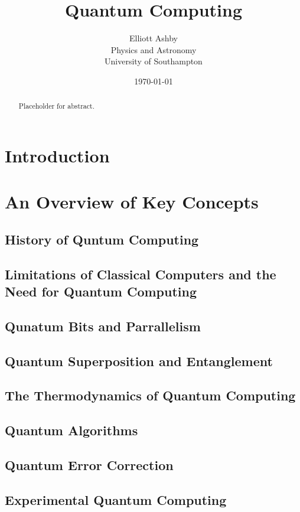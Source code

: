 \documentclass[12pt]{amsart}
\title{Quantum Computing}
\author{Elliott Ashby \\ Physics and Astronomy \\ University of Southampton}
\date{\monthyeardate\today}
\begin{document}
\begin{abstract}
    Placeholder for abstract.
\end{abstract}
\maketitle
\tableofcontents
\section{Introduction}
\section{An Overview of Key Concepts}
\subsection{History of Quntum Computing}
\subsection{Limitations of Classical Computers and the Need for Quantum Computing}
\subsection{Qunatum Bits and Parrallelism}
\subsection{Quantum Superposition and Entanglement}
\subsection{The Thermodynamics of Quantum Computing}
\subsection{Quantum Algorithms}
\subsection{Quantum Error Correction}
\subsection{Experimental Quantum Computing}
\end{document}
